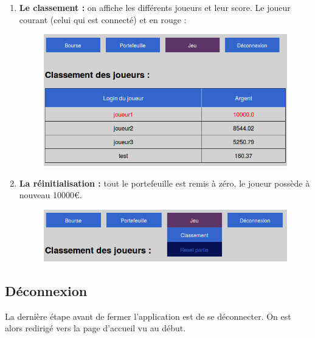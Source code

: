     \begin{enumerate}
     \item \textbf{Le classement :} on affiche les différents joueurs et leur score. Le joueur courant (celui qui est connecté) et en rouge :
     \begin{figure}[H]
	\center
	\includegraphics[scale=0.5]{../graph/8-jeuclassement.png}
      \end{figure} 
     \item \textbf{La réinitialisation :} tout le portefeuille est remis à zéro, le joueur possède à nouveau 10000€.
      \begin{figure}[H]
	\center
	\includegraphics[scale=0.5]{../graph/8-jeuresetpartie.png}
      \end{figure} 
    \end{enumerate}
  
    \subsection{Déconnexion}
    La dernière étape avant de fermer l'application est de se déconnecter. On est alors redirigé vers la page d'accueil vu au début.